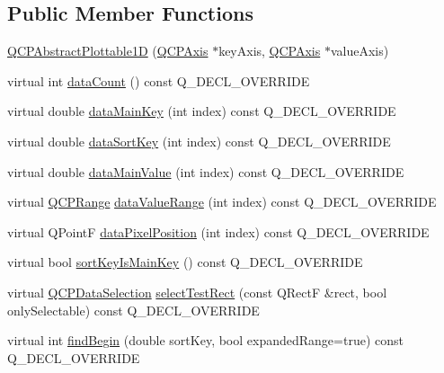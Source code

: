 \subsection*{Public Member Functions}
\begin{DoxyCompactItemize}
\item 
\hyperlink{classQCPAbstractPlottable1D_a30b2e50ab0afce65f104ea7a95440315}{Q\+C\+P\+Abstract\+Plottable1D} (\hyperlink{classQCPAxis}{Q\+C\+P\+Axis} $\ast$key\+Axis, \hyperlink{classQCPAxis}{Q\+C\+P\+Axis} $\ast$value\+Axis)
\item 
virtual int \hyperlink{classQCPAbstractPlottable1D_ab5dd99e4f1621e7dbd63438e0b02984e}{data\+Count} () const Q\+\_\+\+D\+E\+C\+L\+\_\+\+O\+V\+E\+R\+R\+I\+DE
\item 
virtual double \hyperlink{classQCPAbstractPlottable1D_aeb156ebf5d3c8de906b428be30733ad8}{data\+Main\+Key} (int index) const Q\+\_\+\+D\+E\+C\+L\+\_\+\+O\+V\+E\+R\+R\+I\+DE
\item 
virtual double \hyperlink{classQCPAbstractPlottable1D_aa8277da921b009bce474437d50b4a2d8}{data\+Sort\+Key} (int index) const Q\+\_\+\+D\+E\+C\+L\+\_\+\+O\+V\+E\+R\+R\+I\+DE
\item 
virtual double \hyperlink{classQCPAbstractPlottable1D_a6be0f657ba85a1688336d76ad649ecf2}{data\+Main\+Value} (int index) const Q\+\_\+\+D\+E\+C\+L\+\_\+\+O\+V\+E\+R\+R\+I\+DE
\item 
virtual \hyperlink{classQCPRange}{Q\+C\+P\+Range} \hyperlink{classQCPAbstractPlottable1D_a55f937ba6a63e56e57f0b1a6e85a333a}{data\+Value\+Range} (int index) const Q\+\_\+\+D\+E\+C\+L\+\_\+\+O\+V\+E\+R\+R\+I\+DE
\item 
virtual Q\+PointF \hyperlink{classQCPAbstractPlottable1D_a6ca0699a6af5f25a7565de7c50ce13b2}{data\+Pixel\+Position} (int index) const Q\+\_\+\+D\+E\+C\+L\+\_\+\+O\+V\+E\+R\+R\+I\+DE
\item 
virtual bool \hyperlink{classQCPAbstractPlottable1D_afe0d56e39cc076032922f059b304c092}{sort\+Key\+Is\+Main\+Key} () const Q\+\_\+\+D\+E\+C\+L\+\_\+\+O\+V\+E\+R\+R\+I\+DE
\item 
virtual \hyperlink{classQCPDataSelection}{Q\+C\+P\+Data\+Selection} \hyperlink{classQCPAbstractPlottable1D_a22377bf6e57ab7eedbc9e489250c6ded}{select\+Test\+Rect} (const Q\+RectF \&rect, bool only\+Selectable) const Q\+\_\+\+D\+E\+C\+L\+\_\+\+O\+V\+E\+R\+R\+I\+DE
\item 
virtual int \hyperlink{classQCPAbstractPlottable1D_ad0b46d25cde3d035b180fb8f10c056e6}{find\+Begin} (double sort\+Key, bool expanded\+Range=true) const Q\+\_\+\+D\+E\+C\+L\+\_\+\+O\+V\+E\+R\+R\+I\+DE

\end{DoxyCompactItemize}
